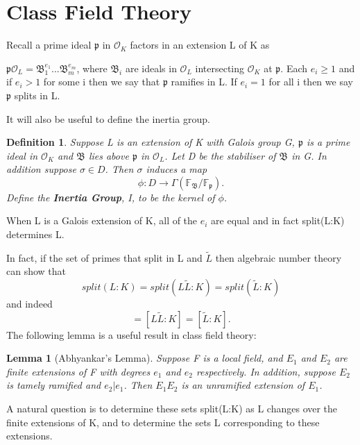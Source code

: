 \documentclass[preprint,12pt,reqno]{elsarticle}
\newtheorem{lemma}[theorem]{Lemma}
\newtheorem{definition}{Definition}
\begin{document}
\section{Class Field Theory}
Recall a prime ideal $\mathfrak{p}$ in $\mathcal{O}_K$ factors in an extension L of K as
\par
$\mathfrak{p}\mathcal{O}_L=\mathfrak{B}_1^{e_1}...\mathfrak{B}_m^{e_m}$, where $\mathfrak{B}_i$ are ideals in $\mathcal{O}_L$ intersecting $\mathcal{O}_K$ at $\mathfrak{p}$. Each $e_i\geq1$ and if $e_i>1$ for some i then we say that $\mathfrak{p}$ ramifies in L. If $e_i=1$ for all i then we say $\mathfrak{p}$ splits in L.
\par
It will also be useful to define the inertia group.\begin{definition}
 Suppose L is an extension of K with Galois group G, $\mathfrak{p}$ is a prime ideal in $\mathcal{O}_K$ and $\mathfrak{B}$ lies above $\mathfrak{p}$ in $\mathcal{O}_L$. Let D be the stabiliser of $\mathfrak{B}$ in G. In addition suppose $\sigma \in D$. Then $\sigma$ induces a map \begin{equation}
     \phi :D\longrightarrow\Gamma(\mathbb{F}_\mathfrak{B}/\mathbb{F}_\mathfrak{p}).
 \end{equation}
 Define the \textbf{Inertia Group}, I, to be the kernel of $\phi$.
\end{definition}
When L is a Galois extension of K, all of the $e_i$ are equal and in fact split(L:K) determines L.
\par
In fact, if the set of primes that split in L and $\tilde{L}$ then algebraic number theory can show that
\begin{equation}
 split(L:K)=split(L\tilde{L}:K)=split(\tilde{L}:K)
\end{equation}
 and indeed 
 \begin{equation}
 [L:K]=[L\tilde{L}:K]=[\tilde{L}:K].
 \end{equation}
 The following lemma is a useful result in class field theory:
 \begin{lemma}[Abhyankar's Lemma]
    Suppose F is a local field, and $E_1$ and $E_2$ are finite extensions of F with degrees $e_1$ and $e_2$ respectively. In addition, suppose $E_2$ is tamely ramified and $e_2|e_1$. Then $E_1E_2$ is an unramified extension of $E_1$.
 \end{lemma}
A natural question is to determine these sets split(L:K) as L changes over the finite extensions of K, and to determine the sets L corresponding to these extensions.
\par
\end{document}
